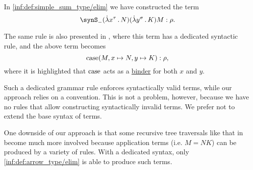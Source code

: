 \begin{remark}\label{rem:binders_in_type_theory_terms}
  In \ref{inf:def:simple_sum_type/elim} we have constructed the term
  \begin{equation*}
    \synS_- (\qabs {x^\tau} N) (\qabs {y^\sigma} K) M: \rho.
  \end{equation*}

  The same rule is also presented in \cite[\S 4.3.3]{Mimram2020ProgramEqualsProof}, where this term has a dedicated syntactic rule, and the above term becomes
  \begin{equation*}
    \op{case}(M, x \mapsto N, y \mapsto K): \rho,
  \end{equation*}
  where it is highlighted that \( \op{case} \) acts as a \hyperref[con:variable_binding]{binder} for both \( x \) and \( y \).

  Such a dedicated grammar rule enforces syntactically valid terms, while our approach relies on a convention. This is not a problem, however, because we have no rules that allow constructing syntactically invalid terms. We prefer not to extend the base syntax of terms.
\end{remark}
\begin{comments}
  \item One downside of our approach is that some recursive tree traversals like that in  become much more involved because application terms (i.e. \( M = NK \)) can be produced by a variety of rules. With a dedicated syntax, only \ref{inf:def:arrow_type/elim} is able to produce such terms.
\end{comments}

